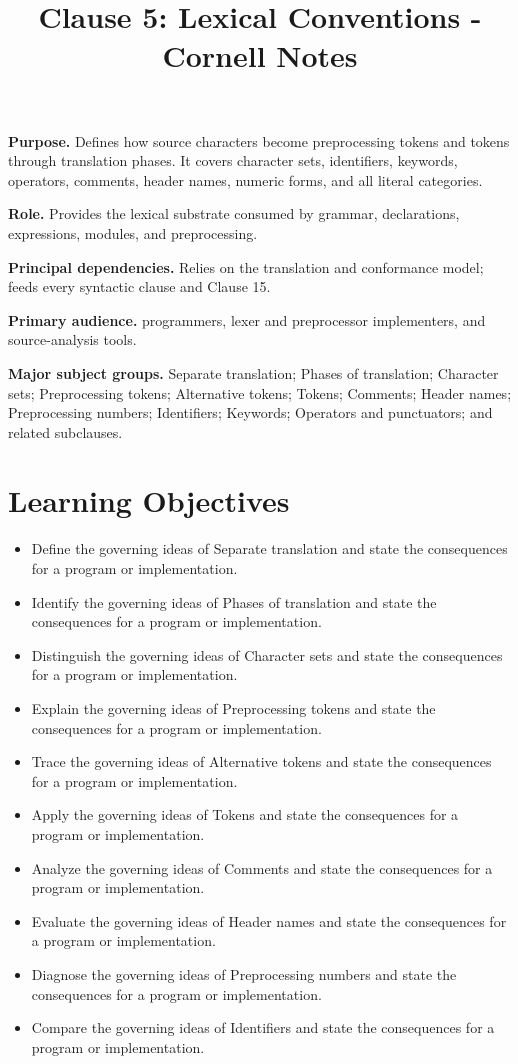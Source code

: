 \documentclass[11pt,letterpaper]{article}
\title{Clause 5: Lexical Conventions - Cornell Notes}
\author{}
\date{}
\begin{document}
\maketitle
\begin{CornellReferenceOrientationBox}
\textbf{Purpose.} Defines how source characters become preprocessing tokens and tokens through translation phases. It covers character sets, identifiers, keywords, operators, comments, header names, numeric forms, and all literal categories.
\par\textbf{Role.} Provides the lexical substrate consumed by grammar, declarations, expressions, modules, and preprocessing.
\par\textbf{Principal dependencies.} Relies on the translation and conformance model; feeds every syntactic clause and Clause 15.
\par\textbf{Primary audience.} programmers, lexer and preprocessor implementers, and source-analysis tools.
\par\textbf{Major subject groups.} Separate translation; Phases of translation; Character sets; Preprocessing tokens; Alternative tokens; Tokens; Comments; Header names; Preprocessing numbers; Identifiers; Keywords; Operators and punctuators; and related subclauses.
\end{CornellReferenceOrientationBox}
\section{Learning Objectives}
\begin{itemize}[label=\textcolor{CornellReferenceTeal}{$\blacktriangleright$}]
\item Define the governing ideas of Separate translation and state the consequences for a program or implementation.
\item Identify the governing ideas of Phases of translation and state the consequences for a program or implementation.
\item Distinguish the governing ideas of Character sets and state the consequences for a program or implementation.
\item Explain the governing ideas of Preprocessing tokens and state the consequences for a program or implementation.
\item Trace the governing ideas of Alternative tokens and state the consequences for a program or implementation.
\item Apply the governing ideas of Tokens and state the consequences for a program or implementation.
\item Analyze the governing ideas of Comments and state the consequences for a program or implementation.
\item Evaluate the governing ideas of Header names and state the consequences for a program or implementation.
\item Diagnose the governing ideas of Preprocessing numbers and state the consequences for a program or implementation.
\item Compare the governing ideas of Identifiers and state the consequences for a program or implementation.
\end{itemize}
\end{document}
